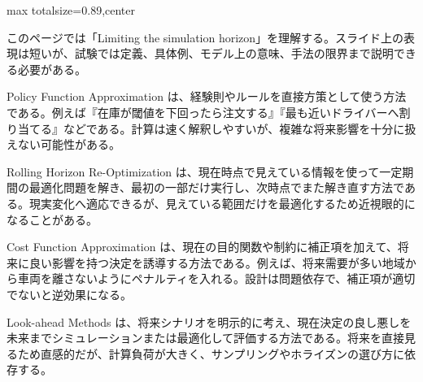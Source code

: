 \begin{minipage}[t]{0.58\textwidth}
\begin{adjustbox}{max totalsize={\textwidth}{0.89\textheight},center}
\begin{minipage}{\textwidth}\scriptsize
{}このページでは「Limiting the simulation horizon」を理解する。スライド上の表現は短いが、試験では定義、具体例、モデル上の意味、手法の限界まで説明できる必要がある。\par
Policy Function Approximation は、経験則やルールを直接方策として使う方法である。例えば『在庫が閾値を下回ったら注文する』『最も近いドライバーへ割り当てる』などである。計算は速く解釈しやすいが、複雑な将来影響を十分に扱えない可能性がある。\par
Rolling Horizon Re-Optimization は、現在時点で見えている情報を使って一定期間の最適化問題を解き、最初の一部だけ実行し、次時点でまた解き直す方法である。現実変化へ適応できるが、見えている範囲だけを最適化するため近視眼的になることがある。\par
Cost Function Approximation は、現在の目的関数や制約に補正項を加えて、将来に良い影響を持つ決定を誘導する方法である。例えば、将来需要が多い地域から車両を離さないようにペナルティを入れる。設計は問題依存で、補正項が適切でないと逆効果になる。\par
Look-ahead Methods は、将来シナリオを明示的に考え、現在決定の良し悪しを未来までシミュレーションまたは最適化して評価する方法である。将来を直接見るため直感的だが、計算負荷が大きく、サンプリングやホライズンの選び方に依存する。\par

\end{minipage}
\end{adjustbox}
\end{minipage}
